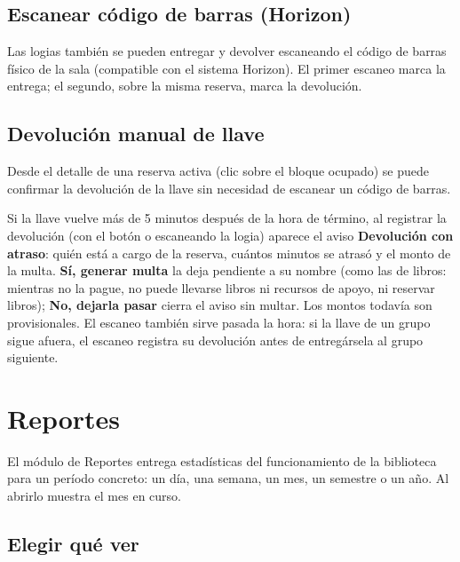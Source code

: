 \documentclass[11pt,a4paper]{report}
\begin{document}
\section{Escanear código de barras (Horizon)}

Las logias también se pueden entregar y devolver escaneando el código de
barras físico de la sala (compatible con el sistema Horizon). El primer
escaneo marca la entrega; el segundo, sobre la misma reserva, marca la
devolución.

\section{Devolución manual de llave}

Desde el detalle de una reserva activa (clic sobre el bloque ocupado) se
puede confirmar la devolución de la llave sin necesidad de escanear un
código de barras.

Si la llave vuelve más de 5 minutos después de la hora de término, al
registrar la devolución (con el botón o escaneando la logia) aparece el
aviso \textbf{Devolución con atraso}: quién está a cargo de la reserva,
cuántos minutos se atrasó y el monto de la multa. \textbf{Sí, generar multa}
la deja pendiente a su nombre (como las de libros: mientras no la pague, no
puede llevarse libros ni recursos de apoyo, ni reservar libros);
\textbf{No, dejarla pasar} cierra el
aviso sin multar. Los montos todavía son provisionales. El escaneo también
sirve pasada la hora: si la llave de un grupo sigue afuera, el escaneo
registra su devolución antes de entregársela al grupo siguiente.

\chapter{Reportes}

El módulo de Reportes entrega estadísticas del funcionamiento de la
biblioteca para un período concreto: un día, una semana, un mes, un
semestre o un año. Al abrirlo muestra el mes en curso.



\section{Elegir qué ver}
\end{document}
